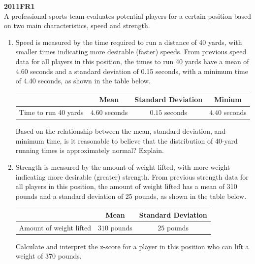 \documentclass[a4paper, 12pt,twoside]{book}
\begin{document}
\colorbox{champagne}{
\begin{minipage}{\textwidth}
 \textbf{2011FR1}\\
 A professional sports team evaluates potential players for a certain position based on two main characteristics, speed and strength.
   \begin{enumerate}[label = (\alph* )]
      \item Speed is measured by the time required to run a distance of 40 yards, with smaller times indicating more desirable (faster) speeds. From previous speed data for all players in this position, the times to run 40 yards have a mean of 4.60 seconds and a standard deviation of 0.15 seconds, with a minimum time of 4.40 seconds, as shown in the table below.
      \begin{center}
        \begin{tabular}{|c|c|c|c|}
        \hline
         &Mean&Standard Deviation & Minium\\
         \hline
         Time to run 40 yards &$4.60$ seconds &$0.15$ seconds&$4.40$ seconds\\
        \hline
        \end{tabular}
      \end{center}
      
Based on the relationship between the mean, standard deviation, and minimum time, is it reasonable to believe that the distribution of 40-yard running times is approximately normal? Explain.

   \item  Strength is measured by the amount of weight lifted, with more weight indicating more desirable (greater) strength. From previous strength data for all players in this position, the amount of weight lifted has a mean of 310 pounds and a standard deviation of 25 pounds, as shown in the table below.
        \begin{center}
          \begin{tabular}{|c|c|c|}
          \hline
          &Mean&Standard Deviation\\
          \hline
          Amount of weight lifted& $310$ pounds&$25$ pounds\\
          \hline
          \end{tabular}
        \end{center}
       Calculate and interpret the z-score for a player in this position who can lift a weight of 370 pounds.
       

\end{enumerate}
\end{minipage}}
\end{document}

